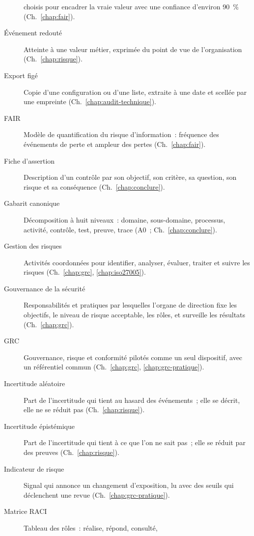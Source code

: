 \begin{description}
          choisis pour encadrer la vraie valeur avec une confiance d'environ
          90~\% (Ch.~\ref{chap:fair}).
    \item[Événement redouté] Atteinte à une valeur métier, exprimée du point
          de vue de l'organisation (Ch.~\ref{chap:risque}).
    \item[Export figé] Copie d'une configuration ou d'une liste, extraite à
          une date et scellée par une empreinte (Ch.~\ref{chap:audit-technique}).
    \item[FAIR] Modèle de quantification du risque d'information~: fréquence
          des événements de perte et ampleur des pertes (Ch.~\ref{chap:fair}).
    \item[Fiche d'assertion] Description d'un contrôle par son objectif, son
          critère, sa question, son risque et sa conséquence
          (Ch.~\ref{chap:conclure}).
    \item[Gabarit canonique] Décomposition à huit niveaux~: domaine,
          sous-domaine, processus, activité, contrôle, test, preuve, trace
          (A0~; Ch.~\ref{chap:conclure}).
    \item[Gestion des risques] Activités coordonnées pour identifier,
          analyser, évaluer, traiter et suivre les risques
          (Ch.~\ref{chap:grc}, \ref{chap:iso27005}).
    \item[Gouvernance de la sécurité] Responsabilités et pratiques par
          lesquelles l'organe de direction fixe les objectifs, le niveau de
          risque acceptable, les rôles, et surveille les résultats
          (Ch.~\ref{chap:grc}).
    \item[GRC] Gouvernance, risque et conformité pilotés comme un seul
          dispositif, avec un référentiel commun (Ch.~\ref{chap:grc},
          \ref{chap:grc-pratique}).
    \item[Incertitude aléatoire] Part de l'incertitude qui tient au hasard
          des événements~; elle se décrit, elle ne se réduit pas
          (Ch.~\ref{chap:risque}).
    \item[Incertitude épistémique] Part de l'incertitude qui tient à ce que
          l'on ne sait pas~; elle se réduit par des preuves
          (Ch.~\ref{chap:risque}).
    \item[Indicateur de risque] Signal qui annonce un changement
          d'exposition, lu avec des seuils qui déclenchent une revue
          (Ch.~\ref{chap:grc-pratique}).
    \item[Matrice RACI] Tableau des rôles~: réalise, répond, consulté,

\end{description}
